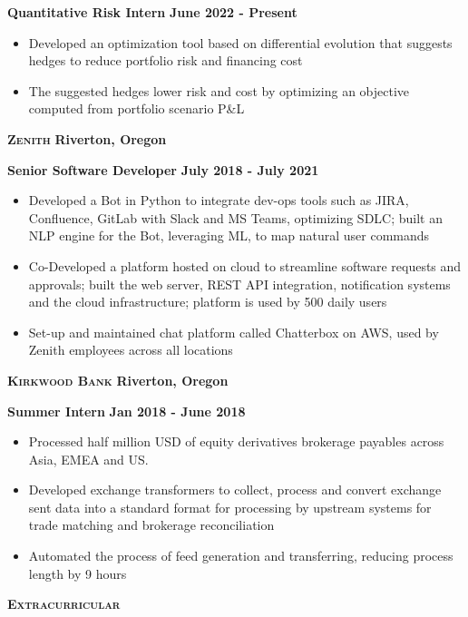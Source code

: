 \documentclass{article}
\newcommand{\vs}{\vspace{0.3cm}}
\begin{document}
\noindent \textbf{Quantitative Risk Intern} \hfill \textbf{June 2022 - Present}
\begin{itemize}
	\item Developed an optimization tool based on differential evolution that suggests hedges to reduce portfolio risk and financing cost
	\item The suggested hedges lower risk and cost by optimizing an objective computed from portfolio scenario P\&L
\end{itemize}

\noindent \textbf{\textsc{Zenith}} \hfill \textbf{Riverton, Oregon}

\noindent \textbf{Senior Software Developer} \hfill \textbf{July 2018 - July 2021}
\begin{itemize}
	\item Developed a Bot in Python to integrate dev-ops tools such as JIRA, Confluence, GitLab with Slack and MS Teams,
optimizing SDLC; built an NLP engine for the Bot, leveraging ML, to map natural user commands
	\item Co-Developed a platform hosted on cloud to streamline software requests and approvals; built the web server, REST
API integration, notification systems and the cloud infrastructure; platform is used by 500 daily users
	\item Set-up and maintained chat platform called Chatterbox on AWS, used by Zenith employees across all locations
\end{itemize}

\noindent \textbf{\textsc{Kirkwood Bank}} \hfill \textbf{Riverton, Oregon}

\noindent \textbf{Summer Intern} \hfill \textbf{Jan 2018 - June 2018}
\begin{itemize}
	\item Processed half million USD of equity derivatives brokerage payables across Asia, EMEA and US.
	\item Developed exchange transformers to collect, process and convert exchange sent data into a standard format for
processing by upstream systems for trade matching and brokerage reconciliation
	\item Automated the process of feed generation and transferring, reducing process length by 9 hours
\end{itemize}




\vs


\noindent \textbf{\textsc{\large Extracurricular}}
\end{document}
